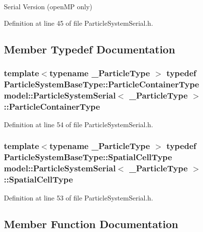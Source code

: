 Serial Version (open\+M\+P only) 

Definition at line 45 of file Particle\+System\+Serial.\+h.



\subsection{Member Typedef Documentation}
\hypertarget{classmodel_1_1_particle_system_serial_a9f62b7a84c09fb9b7a6297630c3a5e6d}{}
\subsubsection[{Particle\+Container\+Type}]{\setlength{\rightskip}{0pt plus 5cm}template$<$typename \+\_\+\+Particle\+Type $>$ typedef {\bf Particle\+System\+Base\+Type\+::\+Particle\+Container\+Type} {\bf model\+::\+Particle\+System\+Serial}$<$ \+\_\+\+Particle\+Type $>$\+::{\bf Particle\+Container\+Type}}\label{classmodel_1_1_particle_system_serial_a9f62b7a84c09fb9b7a6297630c3a5e6d}


Definition at line 54 of file Particle\+System\+Serial.\+h.

\hypertarget{classmodel_1_1_particle_system_serial_ad5979cd0b17a34b3731e4fe505dc86df}{}
\subsubsection[{Spatial\+Cell\+Type}]{\setlength{\rightskip}{0pt plus 5cm}template$<$typename \+\_\+\+Particle\+Type $>$ typedef {\bf Particle\+System\+Base\+Type\+::\+Spatial\+Cell\+Type} {\bf model\+::\+Particle\+System\+Serial}$<$ \+\_\+\+Particle\+Type $>$\+::{\bf Spatial\+Cell\+Type}}\label{classmodel_1_1_particle_system_serial_ad5979cd0b17a34b3731e4fe505dc86df}


Definition at line 53 of file Particle\+System\+Serial.\+h.



\subsection{Member Function Documentation}
\hypertarget{classmodel_1_1_particle_system_serial_a8c7100247eaa48f31863d0902fd3d526}{}
